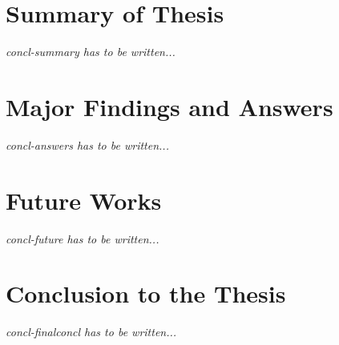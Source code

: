 \documentclass[letterpaper, openright]{report}
\begin{document}
	\section{Summary of Thesis} %
	\label{sub:concl-summary}
\textit{concl-summary has to be written...}
    
	\section{Major Findings and Answers} %
	\label{sub:concl-answers}
\textit{concl-answers has to be written...}
    
	\section{Future Works} %
	\label{sub:concl-future}
\textit{concl-future has to be written...}

	\section{Conclusion to the Thesis} %
	\label{sub:concl-finalconcl}
\textit{concl-finalconcl has to be written...}

	\vspace{0.5cm}       

	\newpage



\vspace{0.5cm}  




	\newpage
    
\end{document}
